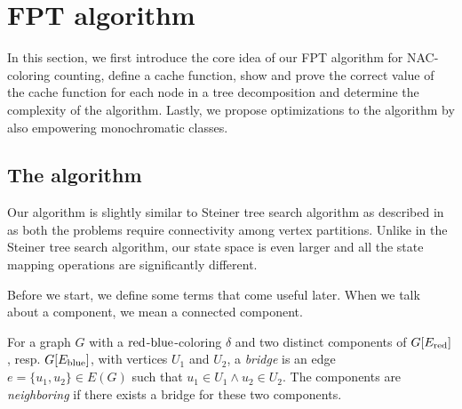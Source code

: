 \section{FPT algorithm}

In this section, we first introduce the core idea of
our FPT algorithm for NAC-coloring counting,
define a cache function,
show and prove the correct value of the cache function for each node in a tree decomposition
and determine the complexity of the algorithm.
Lastly, we propose optimizations to the algorithm by also empowering monochromatic classes.


\subsection{The algorithm}

Our algorithm is slightly similar to Steiner tree search algorithm
as described in~\cite{book_parametrized_algorithms} as both the problems require connectivity
among vertex partitions. Unlike in the Steiner tree search algorithm,
our state space is even larger and all the state mapping operations are significantly different.

Before we start, we define some terms that come useful later.
When we talk about a component, we mean a connected component.
%
\begin{definition}
	For a graph \( G \) with a \( \text{red} \)-\( \text{blue} \)-coloring \( \delta \)
	and two distinct components of \( G[E_\text{red}] \), resp. \( G[E_\text{blue}] \),
	with vertices \( U_1 \) and \( U_2 \),
	a \emph{bridge} is an edge \( e = \{u_1, u_2\} \in E(G) \)
	such that \( u_1 \in U_1 \land u_2 \in U_2 \).
	The components are \emph{neighboring} if there exists
	a bridge for these two components.
\end{definition}
%

